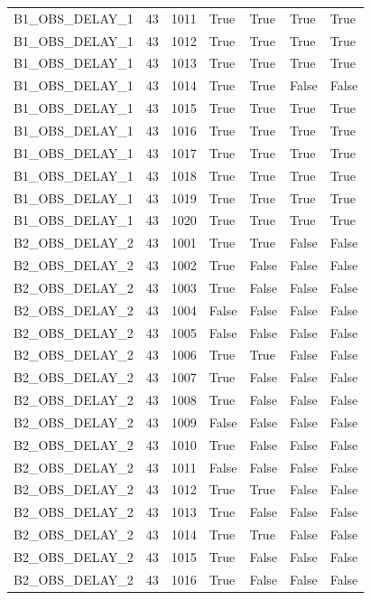\documentclass[11pt,a4paper,oneside]{book}
\begin{document}
\begin{longtable}{l l l l l l l}
B1\_OBS\_DELAY\_1 & 43 & 1011 & True & True & True & True \\
B1\_OBS\_DELAY\_1 & 43 & 1012 & True & True & True & True \\
B1\_OBS\_DELAY\_1 & 43 & 1013 & True & True & True & True \\
B1\_OBS\_DELAY\_1 & 43 & 1014 & True & True & False & False \\
B1\_OBS\_DELAY\_1 & 43 & 1015 & True & True & True & True \\
B1\_OBS\_DELAY\_1 & 43 & 1016 & True & True & True & True \\
B1\_OBS\_DELAY\_1 & 43 & 1017 & True & True & True & True \\
B1\_OBS\_DELAY\_1 & 43 & 1018 & True & True & True & True \\
B1\_OBS\_DELAY\_1 & 43 & 1019 & True & True & True & True \\
B1\_OBS\_DELAY\_1 & 43 & 1020 & True & True & True & True \\
B2\_OBS\_DELAY\_2 & 43 & 1001 & True & True & False & False \\
B2\_OBS\_DELAY\_2 & 43 & 1002 & True & False & False & False \\
B2\_OBS\_DELAY\_2 & 43 & 1003 & True & False & False & False \\
B2\_OBS\_DELAY\_2 & 43 & 1004 & False & False & False & False \\
B2\_OBS\_DELAY\_2 & 43 & 1005 & False & False & False & False \\
B2\_OBS\_DELAY\_2 & 43 & 1006 & True & True & False & False \\
B2\_OBS\_DELAY\_2 & 43 & 1007 & True & False & False & False \\
B2\_OBS\_DELAY\_2 & 43 & 1008 & True & False & False & False \\
B2\_OBS\_DELAY\_2 & 43 & 1009 & False & False & False & False \\
B2\_OBS\_DELAY\_2 & 43 & 1010 & True & False & False & False \\
B2\_OBS\_DELAY\_2 & 43 & 1011 & False & False & False & False \\
B2\_OBS\_DELAY\_2 & 43 & 1012 & True & True & False & False \\
B2\_OBS\_DELAY\_2 & 43 & 1013 & True & False & False & False \\
B2\_OBS\_DELAY\_2 & 43 & 1014 & True & True & False & False \\
B2\_OBS\_DELAY\_2 & 43 & 1015 & True & False & False & False \\
B2\_OBS\_DELAY\_2 & 43 & 1016 & True & False & False & False \\

\end{longtable}
\end{document}

